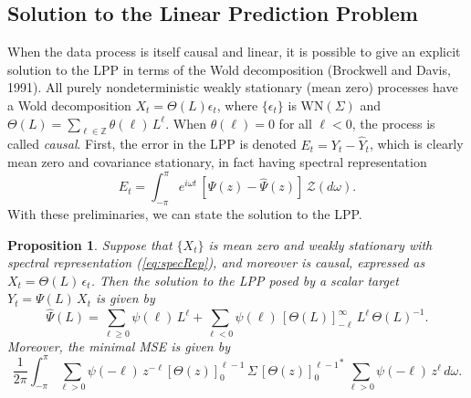 \documentclass[a4paper]{book}
\def\ZZ{\mathbb Z}
\newtheorem{Proposition}{Proposition}
\begin{document}
\subsection{Solution to the Linear Prediction Problem}

 When the data process is itself causal and linear, it is possible
 to give an explicit solution to the LPP in terms of the Wold
 decomposition (Brockwell and Davis, 1991).
  All purely nondeterministic weakly stationary (mean zero) processes
 have a Wold decomposition $X_t = \Theta (L) \epsilon_t$, where $\{
 \epsilon_t \}$ is $\mbox{WN} (\Sigma)$ and $\Theta (L) =
 \sum_{\ell \in \ZZ} \theta (\ell) \, L^{\ell}$.
 When $\theta (\ell) = 0 $ for all $\ell < 0 $, the process is called {\em causal}.
 First, the error in the LPP is denoted $E_t = Y_t - \widehat{Y}_t$, which is
 clearly mean zero  and covariance  stationary, in fact having spectral representation
\begin{equation}
\label{eq:dfa-error}
  E_t = \int_{-\pi}^{\pi} e^{i \omega t } \, 
   \left[ \Psi (z) - \widehat{\Psi} (z) \right] \, \mathcal{Z} (d\omega).
\end{equation}
  With these preliminaries, we can state the solution to the LPP.

\begin{Proposition}
 \label{prop:GPP}
 Suppose that $\{ X_t \}$ is mean zero and weakly stationary 
 with spectral representation (\ref{eq:specRep}), and moreover is
 causal, expressed as $X_t = \Theta (L) \, \epsilon_t$.    Then the solution
 to the LPP posed by a scalar target $Y_t = \Psi (L) \, X_t$ is given by
\begin{equation}
 \label{eq:GPPsoln}
 \widehat{\Psi} (L) = \sum_{\ell \geq 0 } \psi (\ell) \,
 L^{\ell} + \sum_{\ell < 0 } \psi (\ell)
 \,  { [ \Theta (L) ]}_{-\ell}^{ \infty  } \, L^{\ell} \, {\Theta (L) }^{-1}.
\end{equation}
 Moreover, the minimal MSE is given by
\begin{equation} 
\label{eq:minimalMSE}
 \frac{1}{ 2 \pi} \int_{-\pi}^{\pi}   \sum_{\ell > 0 } \psi (-\ell) \,
 z^{-\ell} {[ \Theta  (z) ]}_0^{\ell-1}   \,  \Sigma \,
  { {[ \Theta  (z) ]}_0^{ \ell-1} }^*  \,
   \sum_{\ell > 0 } \psi (-\ell) \,  z^{\ell}  \, d\omega.
\end{equation}
 \end{Proposition}
\end{document}

